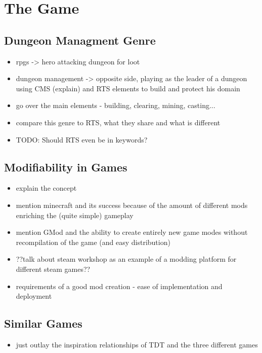 \chapter{The Game}

\section{Dungeon Managment Genre}

\begin{itemize}
    \item rpgs -> hero attacking dungeon for loot
    \item dungeon management -> opposite side, playing as the leader
        of a dungeon using CMS (explain) and RTS elements to build and protect
        his domain
    \item go over the main elements - building, clearing, mining, casting...
    \item compare this genre to RTS, what they share and what is different
    \item TODO: Should RTS even be in keywords?
\end{itemize}

\section{Modifiability in Games}

\begin{itemize}
    \item explain the concept
    \item mention minecraft and its success because of the amount of different
        mods enriching the (quite simple) gameplay
    \item mention GMod and the ability to create entirely new game modes without
        recompilation of the game (and easy distribution)
    \item ??talk about steam workshop as an example of a modding platform for
        different steam games??
    \item requirements of a good mod creation - ease of implementation and deployment
\end{itemize}

\section{Similar Games}

\begin{itemize}
    \item just outlay the inspiration relationships of TDT and the three
        different games
\end{itemize}

